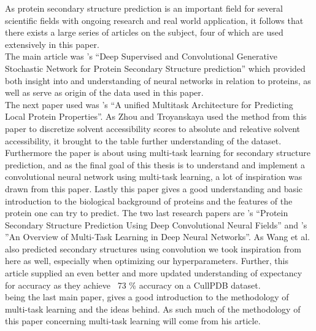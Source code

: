 As protein secondary structure prediction is an important field for several scientific fields with ongoing research and real world application, it follows that there exists a large series of articles on the subject, four of which are used extensively in this paper. \\
The main article was \citeauthor{zhou-and-troyanskaya-2014}’s “Deep Supervised and Convolutional Generative Stochastic Network for Protein Secondary Structure prediction” which provided both insight into and understanding of neural networks in relation to proteins, as well as serve as origin of the data used in this paper. \\
The next paper used was \citeauthor{qi-et-al-2012}’s “A unified Multitask Architecture for Predicting Local Protein Properties”. As Zhou and Troyanskaya used the method from this paper to discretize solvent accessibility scores to absolute and releative solvent accessibility, it brought to the table further understanding of the dataset. Furthermore the paper is about using multi-task learning for secondary structure prediction, and as the final goal of this thesis is to understand and implement a convolutional neural network using multi-task learning, a lot of inspiration was drawn from this paper. Lastly this paper gives a good understanding and basic introduction to the biological background of proteins and the features of the protein one can try to predict. 
The two last research papers are \citeauthor{wang-et-al-2016}’s “Protein Secondary Structure Prediction Using Deep Convolutional Neural Fields” and \citeauthor{ruder-2017}’s ”An Overview of Multi-Task Learning in Deep Neural Networks”.  As Wang et al. also predicted secondary structures using convolution we took inspiration from here as well, especially when optimizing our hyperparameters. Further, this article supplied an even better and more updated understanding of expectancy for accuracy as they achieve ~73 \% accuracy on a CullPDB dataset. \\
\cite{ruder-2017} being the last main paper, gives a good introduction to the methodology of multi-task learning and the ideas behind. As such much of the methodology of this paper concerning multi-task learning will come from his article.










